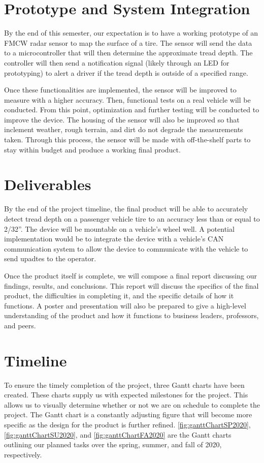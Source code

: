 \documentclass[11pt]{IEEEtran}
\begin{document}
	\section{Prototype and System Integration}
		By the end of this semester, our expectation is to have a working prototype of an FMCW radar sensor to map the surface of a tire. The sensor will send the data to a microcontroller that will then determine the approximate tread depth. The controller will then send a notification signal (likely through an LED for prototyping) to alert a driver if the tread depth is outside of a specified range.

		Once these functionalities are implemented, the sensor will be improved to measure with a higher accuracy. Then, functional tests on a real vehicle will be conducted. From this point, optimization and further testing will be conducted to improve the device. The housing of the sensor will also be improved so that inclement weather, rough terrain, and dirt do not degrade the measurements taken. Through this process, the sensor will be made with off-the-shelf parts to stay within budget and produce a working final product.


	\section{Deliverables}
		By the end of the project timeline, the final product will be able to accurately detect tread depth on a passenger vehicle tire to an accuracy less than or equal to 2/32''. The device will be mountable on a vehicle's wheel well. A potential implementation would be to integrate the device with a vehicle's CAN communication system to allow the device to communicate with the vehicle to send upadtes to the operator.

		Once the product itself is complete, we will compose a final report discussing our findings, results, and conclusions. This report will discuss the specifics of the final product, the difficulties in completing it, and the specific details of how it functions. A poster and presentation will also be prepared to give a high-level understanding of the product and how it functions to business leaders, professors, and peers.


	\section{Timeline}
		To ensure the timely completion of the project, three Gantt charts have been created. These charts supply us with expected milestones for the project. This allows us to visually determine whether or not we are on schedule to complete the project. The Gantt chart is a constantly adjusting figure that will become more specific as the design for the product is further refined. \autoref{fig:ganttChartSP2020}, \autoref{fig:ganttChartSU2020}, and \autoref{fig:ganttChartFA2020} are the Gantt charts outlining our planned tasks over the spring, summer, and fall of 2020, respectively.
\end{document}
